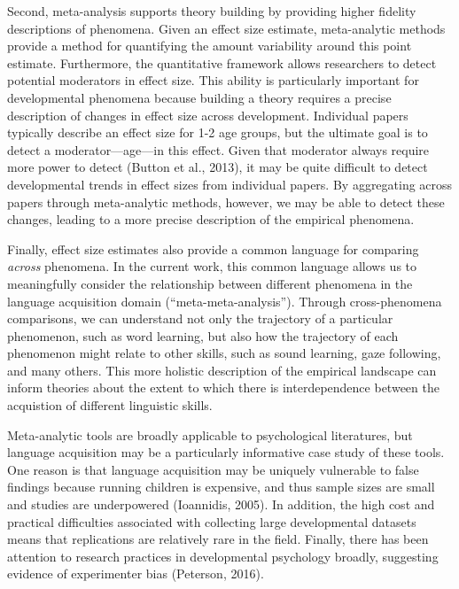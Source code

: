 \documentclass[english,floatsintext,man]{apa6}
\begin{document}
Second, meta-analysis supports theory building by providing higher
fidelity descriptions of phenomena. Given an effect size estimate,
meta-analytic methods provide a method for quantifying the amount
variability around this point estimate. Furthermore, the quantitative
framework allows researchers to detect potential moderators in effect
size. This ability is particularly important for developmental phenomena
because building a theory requires a precise description of changes in
effect size across development. Individual papers typically describe an
effect size for 1-2 age groups, but the ultimate goal is to detect a
moderator---age---in this effect. Given that moderator always require
more power to detect (Button et al., 2013), it may be quite difficult to
detect developmental trends in effect sizes from individual papers. By
aggregating across papers through meta-analytic methods, however, we may
be able to detect these changes, leading to a more precise description
of the empirical phenomena.

Finally, effect size estimates also provide a common language for
comparing \emph{across} phenomena. In the current work, this common
language allows us to meaningfully consider the relationship between
different phenomena in the language acquisition domain
(\enquote{meta-meta-analysis}). Through cross-phenomena comparisons, we
can understand not only the trajectory of a particular phenomenon, such
as word learning, but also how the trajectory of each phenomenon might
relate to other skills, such as sound learning, gaze following, and many
others. This more holistic description of the empirical landscape can
inform theories about the extent to which there is interdependence
between the acquistion of different linguistic skills.

Meta-analytic tools are broadly applicable to psychological literatures,
but language acquisition may be a particularly informative case study of
these tools. One reason is that language acquisition may be uniquely
vulnerable to false findings because running children is expensive, and
thus sample sizes are small and studies are underpowered (Ioannidis,
2005). In addition, the high cost and practical difficulties associated
with collecting large developmental datasets means that replications are
relatively rare in the field. Finally, there has been attention to
research practices in developmental psychology broadly, suggesting
evidence of experimenter bias (Peterson, 2016).
\end{document}
